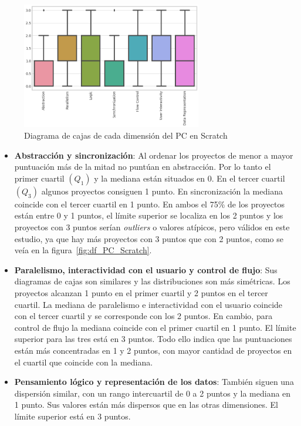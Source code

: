\documentclass[a4paper, 12pt]{book}
\begin{document}
\begin{figure}[H]
    \centering
    \includegraphics[width=0.7\textwidth]{img/diag_cajas_Scratch2.png}
    \caption{Diagrama de cajas de cada dimensión del PC en Scratch}
    \label{fig:cajas_Scratch}
\end{figure}

\begin{itemize}
    \item \textbf{Abstracción y sincronización}: Al ordenar los proyectos de menor a mayor puntuación más de la mitad no puntúan en abstracción. Por lo tanto el primer cuartil $(Q_1)$ y la mediana están situados en 0. En el tercer cuartil $(Q_3)$ algunos proyectos consiguen 1 punto. En sincronización la mediana coincide con el tercer cuartil en 1 punto. En ambos el 75\% de los proyectos están entre 0 y 1 puntos, el límite superior se localiza en los 2 puntos y los proyectos con 3 puntos serían \emph{outliers} o valores atípicos, pero válidos en este estudio, ya que hay más proyectos con 3 puntos que con 2 puntos, como se veía en la  figura~\ref{fig:df_PC_Scratch}.
    \item \textbf{Paralelismo, interactividad con el usuario y control de flujo}: Sus diagramas de cajas son similares y las distribuciones son más simétricas. Los proyectos alcanzan 1 punto en el primer cuartil y 2 puntos en el tercer cuartil. La mediana de paralelismo e interactividad con el usuario coincide con el tercer cuartil y se corresponde con los 2 puntos. En cambio, para control de flujo la mediana coincide con el primer cuartil en 1 punto. El límite superior para las tres está en 3 puntos. Todo ello indica que las puntuaciones están más concentradas en 1 y 2 puntos, con mayor cantidad de proyectos en el cuartil que coincide con la mediana.
    \item\textbf{Pensamiento lógico y representación de los datos}: También siguen una dispersión similar, con un rango intercuartil de 0 a 2 puntos y la mediana en 1 punto. Sus valores están más dispersos que en las otras dimensiones. El límite superior está en 3 puntos. 
\end{itemize}
\end{document}
